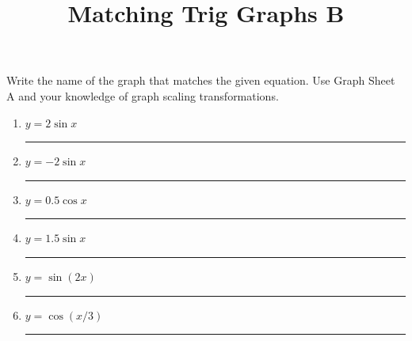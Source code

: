 \documentclass{article}
\begin{document}
\title{Matching Trig Graphs B}
\maketitle
\noindent
Write the name of the graph that matches the given equation. Use Graph Sheet
A and your knowledge of graph scaling transformations.
\begin{multicols}{2}
\begin{enumerate}
	\item $y=2 \sin x$ \hspace{1cm} \rule{5cm}{0.5pt}
	\item $y=-2 \sin x$ \hspace{1cm} \rule{5cm}{0.5pt}
	\item $y=0.5 \cos x$ \hspace{1cm} \rule{5cm}{0.5pt}
	\item $y=1.5 \sin x$ \hspace{1cm} \rule{5cm}{0.5pt}
	\item $y=\sin (2x) $ \hspace{1cm} \rule{5cm}{0.5pt}
	\item $y=\cos(x/3)$ \hspace{1cm} \rule{5cm}{0.5pt}
\end{enumerate}


\end{multicols}
\end{document}
